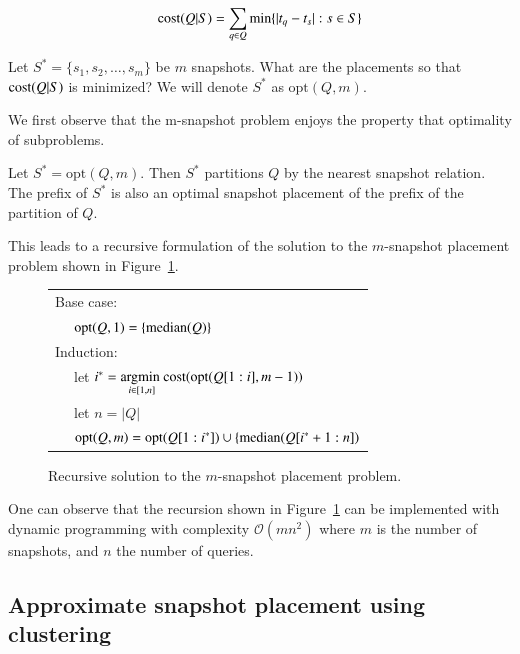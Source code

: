 $$ \mathrm{cost}(Q|S) = \sum_{q\in Q} \min\{|t_q - t_s| : s\in S\} $$

\begin{definition}
    Let $S^* = \{s_1, s_2, \dots, s_m\}$ be $m$ snapshots.  What
    are the placements so that $\mathrm{cost}(Q|S)$ is minimized?
    We will denote $S^*$ as $\mathrm{opt}(Q, m)$.
\end{definition}

We first observe that the m-snapshot problem enjoys the property that optimality
of subproblems.

\begin{theorem}
    Let $S^* = \mathrm{opt}(Q, m)$.  Then $S^*$ partitions $Q$ by the nearest
    snapshot relation.  The prefix of $S^*$ is also an optimal snapshot
    placement of the prefix of the partition of $Q$.
    \label{thm:subproblem}
\end{theorem}

This leads to a recursive formulation of the solution to the $m$-snapshot
placement problem shown in Figure~\ref{fig:recursion}.

\begin{figure}[htbp]
    \centering
    \begin{tabular}{l} \hline \hline
        Base case: \\
        \verb|  | $\mathrm{opt}(Q, 1) = \{\mathrm{median}(Q)\}$ \\ \hline
        Induction: \\
        \verb|  | let $i^* = \underset{i\in[1,n]}{\mathrm{argmin}\ } \mathrm{cost}(\mathrm{opt}(Q[1:i], m-1))$ \\
        \verb|  | let $n = |Q|$ \\
        \verb|  | $\mathrm{opt}(Q, m) = \mathrm{opt}(Q[1:i^*]) \cup \{\mathrm{median}(Q[i^*+1:n])$ \\
        \hline \hline
    \end{tabular}
    \caption{Recursive solution to the $m$-snapshot placement problem.}
    \label{fig:recursion}
\end{figure}

One can observe that the recursion shown in Figure~\ref{fig:recursion} can be
implemented with dynamic programming with complexity $\mathcal{O}(mn^2)$
where $m$ is the number of snapshots, and $n$ the number of queries.


\subsection{Approximate snapshot placement using clustering}

